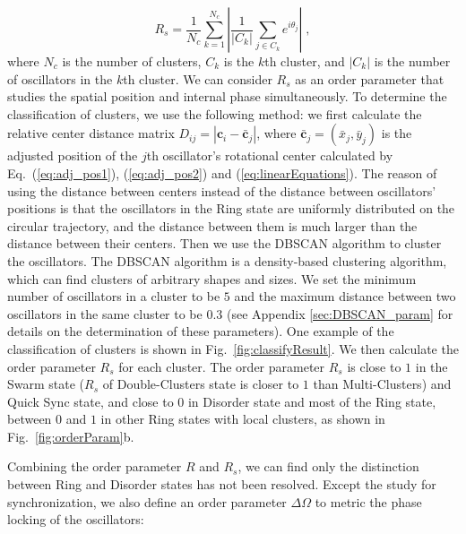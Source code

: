 \documentclass[%
 aip,
 amsmath,amssymb,
 reprint,%
]{revtex4-1}
\begin{document}
\begin{equation}
    R_s=\frac{1}{N_c}\sum_{k=1}^{N_c}{\left| \frac{1}{\left| C_k \right|}\sum_{j\in C_k}{e^{i\theta _j}} \right|}\;,
\end{equation}
where $N_c$ is the number of clusters, $C_k$ is the $k$th cluster, and $\left| C_k \right|$ is the number of oscillators in the $k$th cluster. We can consider $R_s$ as an order parameter that studies the spatial position and internal phase simultaneously.
To determine the classification of clusters, we use the following method: we first calculate the relative center distance matrix $D_{ij}=\left| \mathbf{c}_i-\bar{\mathbf{c}}_j \right|$, where $\bar{\mathbf{c}}_j=\left( \bar{x}_j,\bar{y}_j \right)$ is the adjusted position of the $j$th oscillator's rotational center calculated by Eq.~(\ref{eq:adj_pos1}), (\ref{eq:adj_pos2}) and (\ref{eq:linearEquations}). 
The reason of using the distance between centers instead of the distance between oscillators' positions is that the oscillators in the Ring state are uniformly distributed on the circular trajectory, and the distance between them is much larger than the distance between their centers.
Then we use the DBSCAN algorithm to cluster the oscillators. The DBSCAN algorithm is a density-based clustering algorithm, which can find clusters of arbitrary shapes and sizes. We set the minimum number of oscillators in a cluster to be $5$ and the maximum distance between two oscillators in the same cluster to be $0.3$ (see Appendix \ref{sec:DBSCAN_param} for details on the determination of these parameters). 
One example of the classification of clusters is shown in Fig.~\ref{fig:classifyResult}.
We then calculate the order parameter $R_s$ for each cluster. The order parameter $R_s$ is close to $1$ in the Swarm state ($R_s$ of Double-Clusters state is closer to $1$ than Multi-Clusters) and Quick Sync state, and close to $0$ in Disorder state and most of the Ring state, between $0$ and $1$ in other Ring states with local clusters, as shown in Fig.~\ref{fig:orderParam}b.

Combining the order parameter $R$ and $R_s$, we can find only the distinction between Ring and Disorder states has not been resolved. Except the study for synchronization, we also define an order parameter $\Delta \Omega$ to metric the phase locking of the oscillators:
\end{document}
